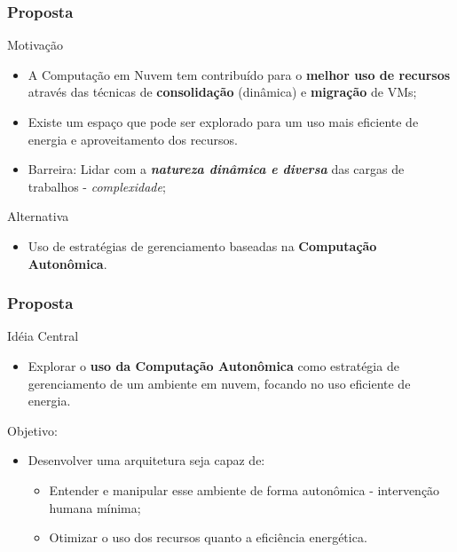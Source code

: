 \frame
{
\frametitle{Proposta}
 	\begin{block}{Motivação}
		\begin{itemize}
			\item A Computação em Nuvem tem contribuído para o \textbf{melhor uso de recursos} através das técnicas de \textbf{consolidação} (dinâmica) e \textbf{migração} de VMs;\vspace{0.5mm}
			\item Existe um espaço que pode ser explorado para um uso mais eficiente de energia e aproveitamento dos recursos.\vspace{0.5mm}
			\item Barreira: Lidar com a \textbf{\textit{natureza dinâmica e diversa}} das cargas de trabalhos - \textit{complexidade};
		\end{itemize}
	\end{block}
	\vspace{-4mm}
	\begin{block}{Alternativa}
		\begin{itemize}
			\item Uso de estratégias de gerenciamento baseadas na \textbf{Computação Autonômica}.
		\end{itemize}
	\end{block}	
}

\frame
{
\frametitle{Proposta}
	\begin{block}{Idéia Central}
		\begin{itemize}
			\item Explorar o \textbf{uso da Computação Autonômica} como estratégia de gerenciamento de um ambiente em nuvem, focando no uso eficiente de energia.
		\end{itemize}
	\end{block}
	
	\begin{block}{Objetivo:}
	 	\begin{itemize}
		 	\item Desenvolver uma arquitetura seja capaz de:
			 \begin{itemize}
			 	\item Entender e manipular esse ambiente de forma autonômica - intervenção humana mínima;
			 	\item Otimizar o uso dos recursos quanto a eficiência energética.
			 \end{itemize}
		\end{itemize}
	\end{block}
}

